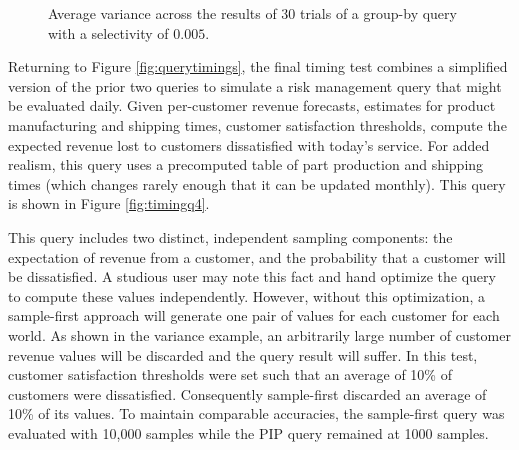 \begin{figure}
\begin{center}
\caption{Average variance across the results of 30 trials of a group-by query with a selectivity of $0.005$.}
\label{fig:variance}
\end{center}
\end{figure}

Returning to Figure \ref{fig:querytimings}, the final timing test combines a simplified version of the prior two queries to simulate a risk management query that might be evaluated daily.  Given per-customer revenue forecasts, estimates for product manufacturing and shipping times, customer satisfaction thresholds, compute the expected revenue lost to customers dissatisfied with today's service.  For added realism, this query uses a precomputed table of part production and shipping times (which changes rarely enough that it can be updated monthly).  This query is shown in Figure \ref{fig:timingq4}.

This query includes two distinct, independent sampling components: the expectation of revenue from a customer, and the probability that a customer will be dissatisfied.  A studious user may note this fact and hand optimize the query to compute these values independently.  However, without this optimization, a sample-first approach will generate one pair of values for each customer for each world.  As shown in the variance example, an arbitrarily large number of customer revenue values will be discarded and the query result will suffer.  In this test, customer satisfaction thresholds were set such that an average of 10\% of customers were dissatisfied.  Consequently sample-first discarded an average of 10\% of its values.  To maintain comparable accuracies, the sample-first query was evaluated with 10,000 samples while the PIP query remained at 1000 samples. 

